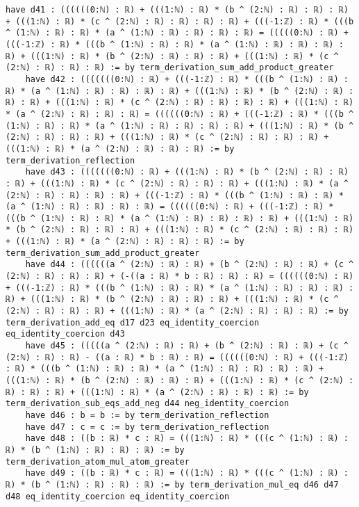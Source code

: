 \documentclass{article}
\begin{document}
\begin{tcolorbox}[colback=white!10, width=\linewidth]
\begin{lstlisting}[language=Lean4]
    have d41 : ((((((0:ℕ) : ℝ) + (((1:ℕ) : ℝ) * (b ^ (2:ℕ) : ℝ) : ℝ) : ℝ) + (((1:ℕ) : ℝ) * (c ^ (2:ℕ) : ℝ) : ℝ) : ℝ) : ℝ) + (((-1:ℤ) : ℝ) * (((b ^ (1:ℕ) : ℝ) : ℝ) * (a ^ (1:ℕ) : ℝ) : ℝ) : ℝ) : ℝ) = (((((0:ℕ) : ℝ) + (((-1:ℤ) : ℝ) * (((b ^ (1:ℕ) : ℝ) : ℝ) * (a ^ (1:ℕ) : ℝ) : ℝ) : ℝ) : ℝ) + (((1:ℕ) : ℝ) * (b ^ (2:ℕ) : ℝ) : ℝ) : ℝ) + (((1:ℕ) : ℝ) * (c ^ (2:ℕ) : ℝ) : ℝ) : ℝ) := by term_derivation_sum_add_product_greater
    have d42 : (((((((0:ℕ) : ℝ) + (((-1:ℤ) : ℝ) * (((b ^ (1:ℕ) : ℝ) : ℝ) * (a ^ (1:ℕ) : ℝ) : ℝ) : ℝ) : ℝ) + (((1:ℕ) : ℝ) * (b ^ (2:ℕ) : ℝ) : ℝ) : ℝ) + (((1:ℕ) : ℝ) * (c ^ (2:ℕ) : ℝ) : ℝ) : ℝ) : ℝ) + (((1:ℕ) : ℝ) * (a ^ (2:ℕ) : ℝ) : ℝ) : ℝ) = ((((((0:ℕ) : ℝ) + (((-1:ℤ) : ℝ) * (((b ^ (1:ℕ) : ℝ) : ℝ) * (a ^ (1:ℕ) : ℝ) : ℝ) : ℝ) : ℝ) + (((1:ℕ) : ℝ) * (b ^ (2:ℕ) : ℝ) : ℝ) : ℝ) + (((1:ℕ) : ℝ) * (c ^ (2:ℕ) : ℝ) : ℝ) : ℝ) + (((1:ℕ) : ℝ) * (a ^ (2:ℕ) : ℝ) : ℝ) : ℝ) := by term_derivation_reflection
    have d43 : (((((((0:ℕ) : ℝ) + (((1:ℕ) : ℝ) * (b ^ (2:ℕ) : ℝ) : ℝ) : ℝ) + (((1:ℕ) : ℝ) * (c ^ (2:ℕ) : ℝ) : ℝ) : ℝ) + (((1:ℕ) : ℝ) * (a ^ (2:ℕ) : ℝ) : ℝ) : ℝ) : ℝ) + (((-1:ℤ) : ℝ) * (((b ^ (1:ℕ) : ℝ) : ℝ) * (a ^ (1:ℕ) : ℝ) : ℝ) : ℝ) : ℝ) = ((((((0:ℕ) : ℝ) + (((-1:ℤ) : ℝ) * (((b ^ (1:ℕ) : ℝ) : ℝ) * (a ^ (1:ℕ) : ℝ) : ℝ) : ℝ) : ℝ) + (((1:ℕ) : ℝ) * (b ^ (2:ℕ) : ℝ) : ℝ) : ℝ) + (((1:ℕ) : ℝ) * (c ^ (2:ℕ) : ℝ) : ℝ) : ℝ) + (((1:ℕ) : ℝ) * (a ^ (2:ℕ) : ℝ) : ℝ) : ℝ) := by term_derivation_sum_add_product_greater
    have d44 : ((((((a ^ (2:ℕ) : ℝ) : ℝ) + (b ^ (2:ℕ) : ℝ) : ℝ) + (c ^ (2:ℕ) : ℝ) : ℝ) : ℝ) + (-((a : ℝ) * b : ℝ) : ℝ) : ℝ) = ((((((0:ℕ) : ℝ) + (((-1:ℤ) : ℝ) * (((b ^ (1:ℕ) : ℝ) : ℝ) * (a ^ (1:ℕ) : ℝ) : ℝ) : ℝ) : ℝ) + (((1:ℕ) : ℝ) * (b ^ (2:ℕ) : ℝ) : ℝ) : ℝ) + (((1:ℕ) : ℝ) * (c ^ (2:ℕ) : ℝ) : ℝ) : ℝ) + (((1:ℕ) : ℝ) * (a ^ (2:ℕ) : ℝ) : ℝ) : ℝ) := by term_derivation_add_eq d17 d23 eq_identity_coercion eq_identity_coercion d43
    have d45 : (((((a ^ (2:ℕ) : ℝ) : ℝ) + (b ^ (2:ℕ) : ℝ) : ℝ) + (c ^ (2:ℕ) : ℝ) : ℝ) - ((a : ℝ) * b : ℝ) : ℝ) = ((((((0:ℕ) : ℝ) + (((-1:ℤ) : ℝ) * (((b ^ (1:ℕ) : ℝ) : ℝ) * (a ^ (1:ℕ) : ℝ) : ℝ) : ℝ) : ℝ) + (((1:ℕ) : ℝ) * (b ^ (2:ℕ) : ℝ) : ℝ) : ℝ) + (((1:ℕ) : ℝ) * (c ^ (2:ℕ) : ℝ) : ℝ) : ℝ) + (((1:ℕ) : ℝ) * (a ^ (2:ℕ) : ℝ) : ℝ) : ℝ) := by term_derivation_sub_eqs_add_neg d44 neg_identity_coercion
    have d46 : b = b := by term_derivation_reflection
    have d47 : c = c := by term_derivation_reflection
    have d48 : ((b : ℝ) * c : ℝ) = (((1:ℕ) : ℝ) * (((c ^ (1:ℕ) : ℝ) : ℝ) * (b ^ (1:ℕ) : ℝ) : ℝ) : ℝ) := by term_derivation_atom_mul_atom_greater
    have d49 : ((b : ℝ) * c : ℝ) = (((1:ℕ) : ℝ) * (((c ^ (1:ℕ) : ℝ) : ℝ) * (b ^ (1:ℕ) : ℝ) : ℝ) : ℝ) := by term_derivation_mul_eq d46 d47 d48 eq_identity_coercion eq_identity_coercion

\end{lstlisting}
\end{tcolorbox}
\end{document}
